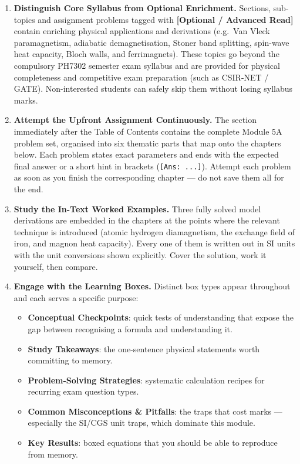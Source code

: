 \documentclass[11pt,a4paper]{article}
\begin{document}
\begin{enumerate}[leftmargin=*]
    \item \textbf{Distinguish Core Syllabus from Optional Enrichment.} Sections, sub-topics and assignment problems tagged with \textbf{[Optional / Advanced Read]} contain enriching physical applications and derivations (e.g.\ Van Vleck paramagnetism, adiabatic demagnetisation, Stoner band splitting, spin-wave heat capacity, Bloch walls, and ferrimagnets). These topics go beyond the compulsory PH7302 semester exam syllabus and are provided for physical completeness and competitive exam preparation (such as CSIR-NET / GATE). Non-interested students can safely skip them without losing syllabus marks.
    \item \textbf{Attempt the Upfront Assignment Continuously.} The section immediately after the Table of Contents contains the complete Module 5A problem set, organised into six thematic parts that map onto the chapters below. Each problem states exact parameters and ends with the expected final answer or a short hint in brackets (\texttt{[Ans: ...]}). Attempt each problem as soon as you finish the corresponding chapter --- do not save them all for the end.
    \item \textbf{Study the In-Text Worked Examples.} Three fully solved model derivations are embedded in the chapters at the points where the relevant technique is introduced (atomic hydrogen diamagnetism, the exchange field of iron, and magnon heat capacity). Every one of them is written out in SI units with the unit conversions shown explicitly. Cover the solution, work it yourself, then compare.
    \item \textbf{Engage with the Learning Boxes.} Distinct box types appear throughout and each serves a specific purpose:
    \begin{itemize}[leftmargin=1.5cm]
        \item \textbf{Conceptual Checkpoints}: quick tests of understanding that expose the gap between recognising a formula and understanding it.
        \item \textbf{Study Takeaways}: the one-sentence physical statements worth committing to memory.
        \item \textbf{Problem-Solving Strategies}: systematic calculation recipes for recurring exam question types.
        \item \textbf{Common Misconceptions \& Pitfalls}: the traps that cost marks --- especially the SI/CGS unit traps, which dominate this module.
        \item \textbf{Key Results}: boxed equations that you should be able to reproduce from memory.

\end{itemize}
\end{enumerate}
\end{document}
